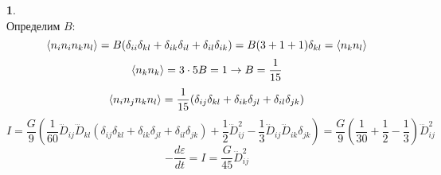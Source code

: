 \documentclass[12pt]{article}
\theoremstyle{definition}
\newtheorem{zad}{}[section]
\begin{document}
\begin{zad}
\begin{equation}
\end{equation}
Определим $B$:
\begin{equation}
    \braket{n_in_in_kn_l}=B(\delta_{ii}\delta_{kl}+\delta_{ik}\delta_{il}+\delta_{il}\delta_{ik})=B(3+1+1)\delta_{kl}=\braket{n_kn_l}
\end{equation}
\begin{equation}
    \braket{n_kn_k}=3\cdot5B=1\rightarrow B=\frac{1}{15}
\end{equation}
\begin{equation}
    \braket{n_in_jn_kn_l}=\frac{1}{15}(\delta_{ij}\delta_{kl}+\delta_{ik}\delta_{jl}+\delta_{il}\delta_{jk})
\end{equation}
\begin{equation}
    I=\frac{G}{9}\left(\frac{1}{60}\dddot{D}_{ij}\dddot{D}_{kl}(\delta_{ij}\delta_{kl}+\delta_{ik}\delta_{jl}+\delta_{il}\delta_{jk})+\frac{1}{2}\dddot{D}_{ij}^2-\frac{1}{3}\dddot{D}_{ij}\dddot{D}_{ik}\delta_{jk}\right)=\frac{G}{9}\left(\frac{1}{30}+\frac{1}{2}-\frac{1}{3}\right)\dddot{D}^2_{ij}
\end{equation}
\begin{equation}
    \boxed{-\frac{d\varepsilon}{dt}=I=\frac{G}{45}\dddot{D}_{ij}^2}
\end{equation}
\end{zad}
\end{document}
